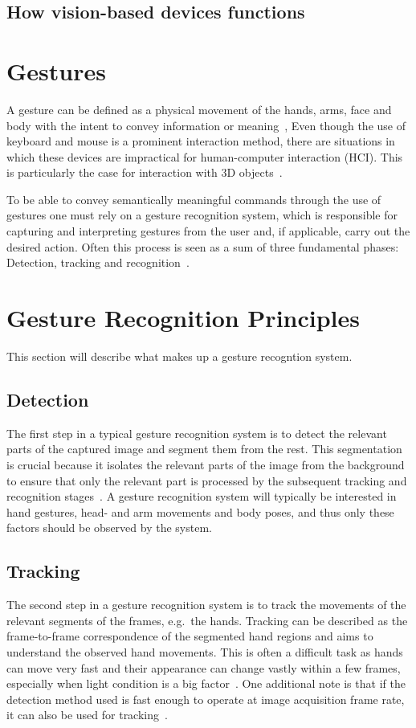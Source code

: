 \subsection{How vision-based devices functions}


\section{Gestures}
A gesture can be defined as a physical movement of the hands, arms, face and body with the intent to convey information or meaning~\citep{Mitra2007}, 
Even though the use of keyboard and mouse is a prominent interaction method, there are situations in which
these devices are impractical for human-computer interaction (HCI). This is particularly the case for interaction with 3D objects~\citep{Rautaray2015}. 

To be able to convey semantically meaningful commands through the use of gestures one must rely on a gesture recognition system, 
which is responsible for capturing and interpreting gestures from the user and, if applicable, carry out the desired action. 
Often this process is seen as a sum of three fundamental phases: Detection, tracking and recognition~\citep{Rautaray2015}.

\section{Gesture Recognition Principles}
This section will describe what makes up a gesture recogntion system.

\subsection{Detection}
The first step in a typical gesture recognition system is to detect the relevant parts of the captured image and segment them from the rest. 
This segmentation is crucial because it isolates the relevant parts of the image from the background to ensure that only the relevant part is processed by the subsequent 
tracking and recognition stages~\citep{Cote2006}. 
A gesture recognition system will typically be interested in hand gestures, head- and arm movements and body poses, and thus only these factors should be observed by the system.

\subsection{Tracking}
The second step in a gesture recognition system is to track the movements of the relevant segments of the frames, e.g.~the hands. 
Tracking can be described as the frame-to-frame correspondence of the segmented hand regions and aims to understand the observed hand movements. 
This is often a difficult task as hands can move very fast and their appearance can change vastly within a few frames, 
especially when light condition is a big factor~\citep{Wang2010}. 
One additional note is that if the detection method used is fast enough to operate at image acquisition frame rate, it can also be used for tracking~\citep{Rautaray2015}.   

